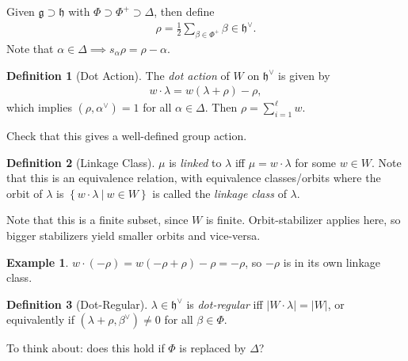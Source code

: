 \documentclass[11pt]{scrartcl}
\theoremstyle{definition}
\theoremstyle{theorem}
\theoremstyle{proof}
\theoremstyle{definition}
\newtheorem{definition}{Definition}[theorem]
\theoremstyle{break}
\newtheorem{example}{Example}[section]
\theoremstyle{problem}
\providecommand{\tightlist}{%
  \setlength{\itemsep}{0pt}\setlength{\parskip}{0pt}}
\newcommand{\abs}[1]{{\left\lvert {#1} \right\rvert}}
\newcommand{\dual}[0]{^\vee}
\newcommand{\lieg}[0]{{\mathfrak{g}}}
\newcommand{\lieh}[0]{{\mathfrak{h}}}
\newcommand{\suchthat}[0]{{~\mathrel{\Big|}~}}
\newcommand{\theset}[1]{\left\{{#1}\right\}}
\begin{document}
Given \(\lieg \supset \lieh\) with
\(\Phi \supset \Phi^+ \supset \Delta\), then define
\begin{align*}\rho = \frac 1 2 \sum_{\beta \in \Phi^+} \beta \in \lieh\dual.\end{align*}
Note that \(\alpha \in \Delta \implies s_\alpha \rho = \rho - \alpha\).

\begin{definition}[Dot Action]

The \emph{dot action} of \(W\) on \(\lieh\dual\) is given by
\begin{align*}w\cdot \lambda = w(\lambda + \rho) - \rho,\end{align*}
which implies \((\rho, \alpha\dual) = 1\) for all \(\alpha \in \Delta\).
Then \(\rho = \sum_{i=1}^\ell w\).\end{definition}

\begin{description}
\tightlist
\item[Exercise]
Check that this gives a well-defined group action.
\end{description}

\begin{definition}[Linkage Class]

\(\mu\) is \emph{linked} to \(\lambda\) iff \(\mu = w\cdot \lambda\) for
some \(w\in W\). Note that this is an equivalence relation, with
equivalence classes/orbits where the orbit of \(\lambda\) is
\(\theset{w\cdot \lambda \suchthat w\in W}\) is called the \emph{linkage
class} of \(\lambda\).\end{definition}

Note that this is a finite subset, since \(W\) is finite.
Orbit-stabilizer applies here, so bigger stabilizers yield smaller
orbits and vice-versa.

\begin{example}

\(w\cdot (-\rho) = w(-\rho + \rho) - \rho = -\rho\), so \(-\rho\) is in
its own linkage class.\end{example}

\begin{definition}[Dot-Regular]

\(\lambda \in \lieh\dual\) is \emph{dot-regular} iff
\(\abs{W\cdot \lambda } = \abs{W}\), or equivalently if
\((\lambda + \rho, \beta\dual) \neq 0\) for all
\(\beta \in \Phi\).\end{definition}

To think about: does this hold if \(\Phi\) is replaced by \(\Delta\)?
\end{document}

